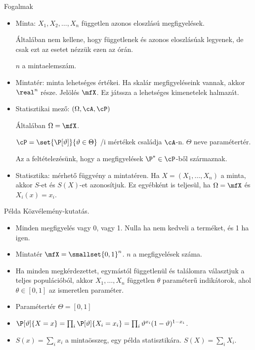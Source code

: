 \documentclass[aspectratio=169,notheorems,9pt,\option]{beamer}
\begin{document}
\begin{frame}{Fogalmak}
  \begin{itemize}
    \item Minta: $X_1,X_2,\dots,X_n$ független azonos eloszlású megfigyelések.
    
    Általában nem kellene, hogy függetlenek és azonos eloszlásúak legyenek, 
    de csak ezt az esetet nézzük ezen az órán. 

    $n$ a mintaelemszám.
    \item Mintatér: minta lehetséges értékei. Ha skalár megfigyeléseink vannak, akkor $\real^n$ része.
    Jelölés $\mfX$. Ez játssza a lehetséges kimenetelek halmazát. 
    \item Statisztikai mező: $(\Omega,\cA,\cP)$ 
    
    Általában $\Omega=\mfX$.  
    
    $\cP=\set{\P[\theta]}{\theta\in \Theta}$ \val/i mértékek családja $\cA$-n. 
    $\Theta$ neve paramétertér.
 
    Az a feltételezésünk, hogy a megfigyelések $\P^*\in\cP$-ből származnak.  

    \item Statisztika: mérhető függvény a mintatéren. Ha $X=(X_1,\dots,X_n)$ a minta, akkor 
    $S$-et és $S(X)$-et azonosítjuk. Ez egyébként is teljesül, ha $\Omega=\mfX$ és $X_i(x)=x_i$.
  \end{itemize}

\end{frame}

\begin{frame}{Példa}
  Közvélemény-kutatás.
  \begin{itemize}
    \item Minden megfigyelés vagy 0, vagy 1. Nulla ha nem kedveli a terméket, és 1 ha igen.
    \item Mintatér $\mfX=\smallset{0,1}^n$. $n$ a megfigyelések száma.
    \item Ha minden megkérdezettet, egymástól függetlenül és találomra választjuk a teljes populációból, 
    akkor $X_1,\dots,X_n$ független $\theta$ paraméterű indikátorok, ahol $\theta\in[0,1]$ az ismeretlen paraméter.
    \item Paramétertér $\Theta=[0,1]$
    \item $\P[\theta]{X=x}=\prod_i \P[\theta]{X_i=x_i}=\prod_i \theta^{x_i}(1-\theta)^{1-x_i}$.
    \item $S(x)=\sum_i x_i$ a mintaösszeg, egy példa statisztikára. $S(X)=\sum_i X_i$. 
  \end{itemize}
\end{frame}
\end{document}
